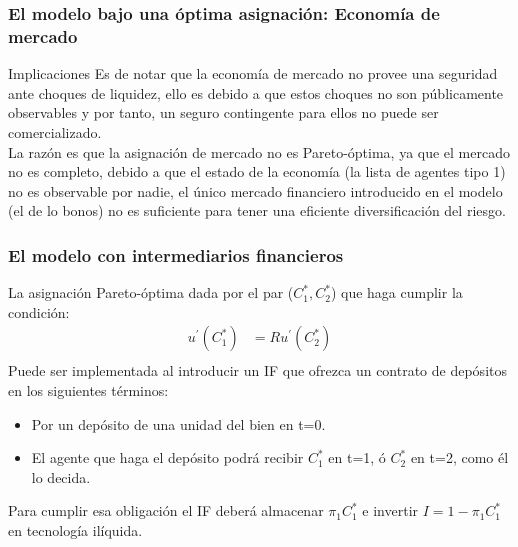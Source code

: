 \begin{frame}
    \frametitle{{\normalsize El modelo bajo una óptima asignación: Economía de mercado } {}}
    
     \begin{block} {Implicaciones}
       Es de notar que la economía de mercado no provee una seguridad ante choques de liquidez, ello es debido a que estos choques no son públicamente observables y por tanto, un seguro contingente para ellos no puede ser comercializado.\\
       La razón es que la asignación de mercado no es Pareto-óptima, ya que el mercado no es completo, debido a que el estado de la economía (la lista de agentes tipo 1) no es observable por nadie, el único mercado financiero introducido en el modelo (el de lo bonos) no es suficiente para tener una eficiente diversificación del riesgo.
        
    \end{block}	
    
\end{frame}

\begin{frame}
    \frametitle{{\normalsize El modelo con intermediarios financieros } {}}
    
    La asignación Pareto-óptima dada por el par ($C_{1}^{*}, C_{2}^{*}$) que haga cumplir la condición:
    \begin{align}
    u^{'}(C_{1}^{*})&=Ru^{'}(C_{2}^{*})\nonumber \\
    \end{align}
    Puede ser implementada al introducir un IF que ofrezca un contrato de depósitos en los siguientes términos:
    \begin{itemize}
        \item Por un depósito de una unidad del bien en t=0.
        \item El agente que haga el depósito podrá recibir $C_{1}^{*}$ en t=1, ó $ C_{2}^{*}$ en t=2, como él lo decida.
     \end{itemize}
 Para cumplir esa obligación el IF deberá almacenar $\pi_{1}C_{1}^{*} $ e invertir $I=1-\pi_{1}C_{1}^{*}$ en tecnología ilíquida.
\end{frame}

